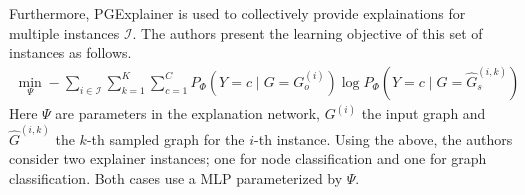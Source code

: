 Furthermore, PGExplainer is used to collectively provide explainations for multiple instances $\mathcal{I}$. The authors present the learning objective of this set of instances as follows.
\begin{align}
    \min _{\Psi}-\sum_{i \in \mathcal{I}} \sum_{k=1}^{K} \sum_{c=1}^{C} P_{\Phi}\left(Y=c \mid G=G_{o}^{(i)}\right) \log P_{\Phi}\left(Y=c \mid G=\hat{G}_{s}^{(i, k)}\right)
\end{align}
Here $\Psi$ are parameters in the explanation network, $G^{(i)}$ the input graph and $\hat{G}^{(i, k)}$ the $k$-th sampled graph for the $i$-th instance.
Using the above, the authors consider two explainer instances; one for node classification and one for graph classification. Both cases use a MLP parameterized by $\Psi$.